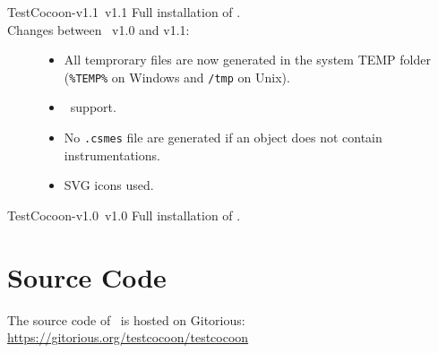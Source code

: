 \begin{TestCocoonDownload}
\begin{TestCocoonDownloadLink}
\end{TestCocoonDownloadLink}
\begin{ReleaseNote}{TestCocoon-v1.1}{\TestCocoon\ v1.1}
Full installation of \TestCocoon.\\
Changes between \TestCocoon\ v1.0 and v1.1:
\begin{description}
\item[\CoverageScanner]
  \begin{itemize}
    \item \NewFeature All temprorary files are now generated in the system TEMP folder (\verb$%TEMP%$ on Windows and \verb$/tmp$ on Unix).
    \item \NewFeature \CMake\ support. 
    \item \Changes No \verb$.csmes$ file are generated if an object does not contain instrumentations.
  \end{itemize}
\item[\CoverageBrowser]
  \begin{itemize}
    \item \Internal SVG icons used.
  \end{itemize}
%

\end{description}
\end{ReleaseNote}
\end{TestCocoonDownload}


\begin{TestCocoonDownload}
\begin{TestCocoonDownloadLink}
\end{TestCocoonDownloadLink}
\begin{ReleaseNote}{TestCocoon-v1.0}{\TestCocoon\ v1.0}
Full installation of \TestCocoon.
\end{ReleaseNote}
\end{TestCocoonDownload}

\section{Source Code}

The source code of \TestCocoon\ is hosted on Gitorious: 
\url{https://gitorious.org/testcocoon/testcocoon}
